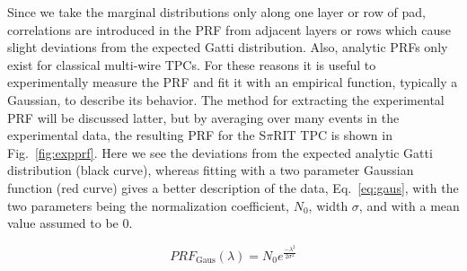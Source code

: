 Since we take the marginal distributions only along one layer or row of pad, correlations are introduced in the PRF from adjacent layers or rows which cause slight deviations from the expected Gatti distribution. Also, analytic PRFs only exist for classical multi-wire TPCs. For these reasons it is useful to experimentally measure the PRF and fit it with an empirical function, typically a Gaussian, to describe its behavior. The method for extracting the experimental PRF will be discussed latter, but by averaging over many events in the experimental data, the resulting PRF for the S$\pi$RIT TPC is shown in Fig.~\ref{fig:expprf}. Here we see the deviations from the expected analytic Gatti distribution (black curve), whereas fitting with a two parameter Gaussian function (red curve) gives a better description of the  data, Eq.~\ref{eq:gaus}, with the two parameters being the normalization coefficient, $N_0$, width $\sigma$, and with a mean value assumed to be 0.

\begin{equation}\label{eq:prfgaus}
PRF_{\mathrm{Gaus}}(\lambda) = N_0 e^\frac{-\lambda^2}{2\sigma^2}
\end{equation}





\begin{comment}
\subsection{Considerations when constructing a TPC}
Several considerations went into the construction of the S$\pi$RI TPC which I wish to summarize and document here. All materials and glues of the TPC were selected as low out-gassing materials. Several materials (that are common place in nuclear labs), such as vacuum grease, viton o-rings, all out-gas organic chemicals into the counter gas which damage the TPC by permanently lowering the gain over time. The organic molecules responsible are difficult to identify exactly, but lists of good and bad materials are well known in the literature from experiments. If a material we wished to used was not on these lists we placed the material in a clean chamber with the counter gas and flowed this counter gas through a small proportional counter making sure the gain did not drop at high collection rates when exposed to a high rate alpha Americium source. 

Sparking
Two volumes of gas. 
\end{comment}


